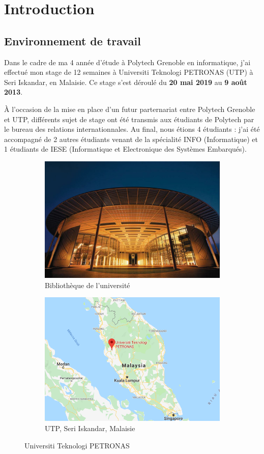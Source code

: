 \chapter{Introduction}

\section{Environnement de travail}

Dans le cadre de ma 4 année d'étude à Polytech Grenoble en informatique, j'ai effectué mon stage de 12 semaines à Universiti Teknologi PETRONAS (UTP) à Seri Iskandar, en Malaisie. Ce stage s'est déroulé du \textbf{20 mai 2019} au \textbf{9 août 2013}.

À l'occasion de la mise en place d'un futur parternariat entre Polytech Grenoble et UTP, différents sujet de stage ont été transmis aux étudiants de Polytech par le bureau des relations internationnales. Au final, nous étions 4 étudiants : j'ai été accompagné de 2 autres étudiants venant de la spécialité INFO (Informatique) et 1 étudiants de IESE (Informatique et Electronique des Systèmes Embarqués).


\begin{figure}[h]
  \centering
  \begin{subfigure}{.5\textwidth}
    \centering
    \includegraphics[width=.8\linewidth]{content/imgs/utp.jpg}
    \caption{Bibliothèque de l'université}
  \end{subfigure}%
  \begin{subfigure}{.5\textwidth}
    \centering
    \includegraphics[width=.8\linewidth]{content/imgs/map.png}
    \caption{UTP, Seri Iskandar, Malaisie}
  \end{subfigure}
  \caption{Universiti Teknologi PETRONAS}
\end{figure}


